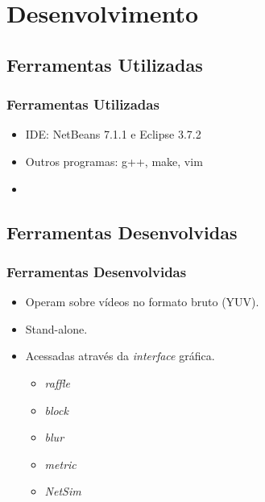 \section{Desenvolvimento}

\subsection{Ferramentas Utilizadas}
    \begin{frame}\frametitle{Ferramentas Utilizadas}
        \begin{itemize}
            \item IDE: NetBeans 7.1.1 e Eclipse 3.7.2
            \item Outros programas: g++, make, vim
            \item 
        \end{itemize}
    \end{frame}
    
\subsection{Ferramentas Desenvolvidas}
    \begin{frame}\frametitle{Ferramentas Desenvolvidas}
        \begin{itemize}
            \item Operam sobre vídeos no formato bruto (YUV). %
            \item Stand-alone.
            \item Acessadas através da \emph{interface} gráfica.
            \begin{itemize}
                \item \emph{raffle}
                \item \emph{block}
                \item \emph{blur}
                \item \emph{metric}
                \item \emph{NetSim}
            \end{itemize}
        \end{itemize}
    \end{frame}
    

